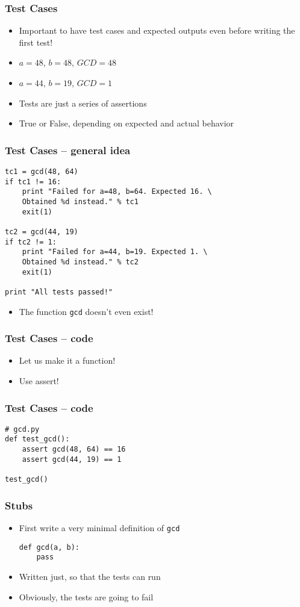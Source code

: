 \documentclass[14pt,compress]{beamer}
\begin{document}
\begin{frame}[fragile]
  \frametitle{Test Cases}
  \begin{itemize}
  \item Important to have test cases and expected outputs even before
    writing the first test!
  \item $a=48$, $b=48$, $GCD=48$
  \item $a=44$, $b=19$, $GCD=1$
  \item Tests are just a series of assertions
  \item True or False, depending on expected and actual behavior
  \end{itemize}

\end{frame}

\begin{frame}[fragile]
  \frametitle{Test Cases -- general idea}
  \small
\begin{lstlisting}
tc1 = gcd(48, 64)
if tc1 != 16:
    print "Failed for a=48, b=64. Expected 16. \
    Obtained %d instead." % tc1
    exit(1)

tc2 = gcd(44, 19)
if tc2 != 1:
    print "Failed for a=44, b=19. Expected 1. \
    Obtained %d instead." % tc2
    exit(1)

print "All tests passed!"
\end{lstlisting}
\begin{itemize}
\item The function \texttt{gcd} doesn't even exist!
\end{itemize}
\end{frame}

\begin{frame}[fragile]
  \frametitle{Test Cases -- code}
  \begin{itemize}
      \item Let us make it a function!
      \item Use assert!
  \end{itemize}
\end{frame}

\begin{frame}[fragile]
  \frametitle{Test Cases -- code}
\begin{lstlisting}
# gcd.py
def test_gcd():
    assert gcd(48, 64) == 16
    assert gcd(44, 19) == 1

test_gcd()
\end{lstlisting}
\end{frame}

\begin{frame}[fragile]
  \frametitle{Stubs}
  \begin{itemize}
  \item First write a very minimal definition of \texttt{gcd}
    \begin{lstlisting}
def gcd(a, b):
    pass
    \end{lstlisting}
  \item Written just, so that the tests can run
  \item Obviously, the tests are going to fail
  \end{itemize}
\end{frame}
\end{document}
